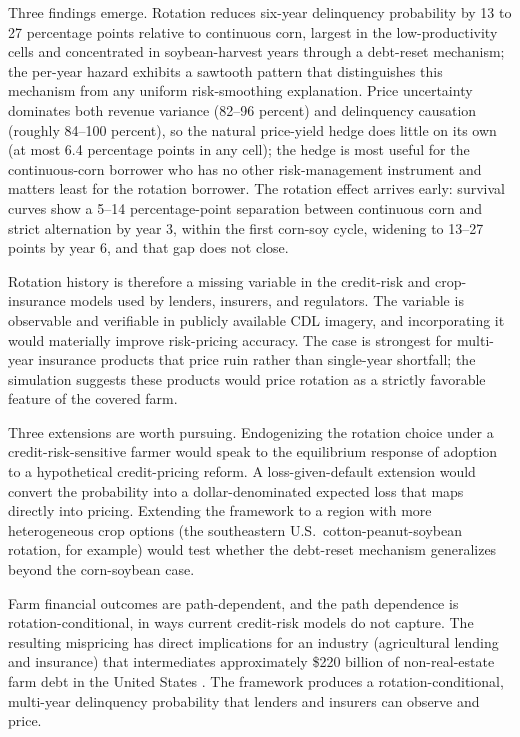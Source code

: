 \documentclass[11pt,letterpaper]{article}
\theoremstyle{remark}
\begin{document}
Three findings emerge. Rotation reduces six-year delinquency probability by 13 to 27 percentage points relative to continuous corn, largest in the low-productivity cells and concentrated in soybean-harvest years through a debt-reset mechanism; the per-year hazard exhibits a sawtooth pattern that distinguishes this mechanism from any uniform risk-smoothing explanation. Price uncertainty dominates both revenue variance (82--96 percent) and delinquency causation (roughly 84--100 percent), so the natural price-yield hedge does little on its own (at most 6.4 percentage points in any cell); the hedge is most useful for the continuous-corn borrower who has no other risk-management instrument and matters least for the rotation borrower. The rotation effect arrives early: survival curves show a 5--14 percentage-point separation between continuous corn and strict alternation by year 3, within the first corn-soy cycle, widening to 13--27 points by year 6, and that gap does not close.
 
Rotation history is therefore a missing variable in the credit-risk and crop-insurance models used by lenders, insurers, and regulators. The variable is observable and verifiable in publicly available CDL imagery, and incorporating it would materially improve risk-pricing accuracy. The case is strongest for multi-year insurance products that price ruin rather than single-year shortfall; the simulation suggests these products would price rotation as a strictly favorable feature of the covered farm.
 
Three extensions are worth pursuing. Endogenizing the rotation choice under a credit-risk-sensitive farmer would speak to the equilibrium response of adoption to a hypothetical credit-pricing reform. A loss-given-default extension would convert the probability into a dollar-denominated expected loss that maps directly into pricing. Extending the framework to a region with more heterogeneous crop options (the southeastern U.S.\ cotton-peanut-soybean rotation, for example) would test whether the debt-reset mechanism generalizes beyond the corn-soybean case.
 
Farm financial outcomes are path-dependent, and the path dependence is rotation-conditional, in ways current credit-risk models do not capture. The resulting mispricing has direct implications for an industry (agricultural lending and insurance) that intermediates approximately \$220 billion of non-real-estate farm debt in the United States \citep{usda2026}. The framework produces a rotation-conditional, multi-year delinquency probability that lenders and insurers can observe and price.
 
\end{document}
